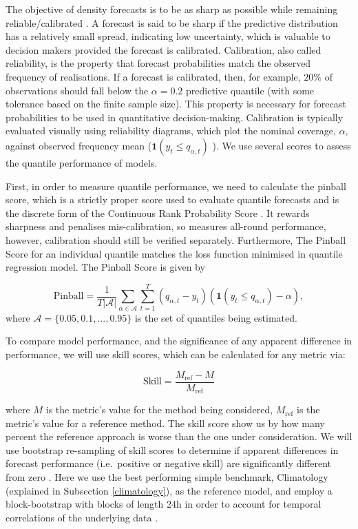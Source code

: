 \documentclass[]{elsarticle} %
\begin{document}
The objective of density forecasts is to be as sharp as possible while remaining reliable/calibrated \citep{gneiting2007probabilistic}. A forecast is said to be sharp if the predictive distribution has a relatively small spread, indicating low uncertainty, which is valuable to decision makers provided the forecast is calibrated. Calibration, also called reliability, is the property that forecast probabilities match the observed frequency of realisations. If a forecast is calibrated, then, for example, \(20\%\) of observations should fall below the \(\alpha=0.2\) predictive quantile (with some tolerance based on the finite sample size). This property is necessary for forecast probabilities to be used in quantitative decision-making. Calibration is typically evaluated visually using reliability diagrams, which plot the nominal coverage, \(\alpha\), against observed frequency mean (\(\mathbf{1}(y_{t}\leq q_{\alpha,t})\)
). We use several scores to assess the quantile performance of models.

First, in order to measure quantile performance, we need to calculate the pinball score, which is a strictly proper score used to evaluate quantile forecasts and is the discrete form of the Continuous Rank Probability Score \citep{hyndman2021forecasting}. It rewards sharpness and penalises mis-calibration, so measures all-round performance, however, calibration should still be verified separately. Furthermore, The Pinball Score for an individual quantile matches the loss function minimised in quantile regression model. The Pinball Score is given by

\begin{equation}
    \text{Pinball} = 
    \frac{1}{T|\mathcal{A}|} \sum_{\alpha \in \mathcal{A}} \sum_{t=1}^T
 \left(q_{\alpha,t} - y_{t} \right)
 \left(\mathbf{1}(y_{t}\leq q_{\alpha,t})-\alpha \right) ,
 \label{eq:pinball}
\end{equation}
where \(\mathcal{A} = \{0.05,0.1,...,0.95\}\) is the set of quantiles being estimated.

To compare model performance, and the significance of any apparent difference in performance, we will use skill scores, which can be calculated for any metric via:

\begin{equation}
  \mathrm{Skill} = \frac{M_\mathrm{ref} - M}{M_\mathrm{ref}} \label{eq:skillscore}
\end{equation}

where \(M\) is the metric's value for the method being considered, \(M_\mathrm{ref}\) is the metric's value for a reference method. The skill score show us by how many percent the reference approach is worse than the one under consideration.
We will use bootstrap re-sampling of skill scores to determine if apparent differences in forecast performance (i.e.~positive or negative skill) are significantly different from zero \citep{Efron1981Bootstrap}. Here we use the best performing simple benchmark, Climatology (explained in Subsection \ref{climatology}), as the reference model, and employ a block-bootstrap with blocks of length 24h in order to account for temporal correlations of the underlying data \citep{hongyi1996bootstrapping, Bergmeir2016303}.
\end{document}
